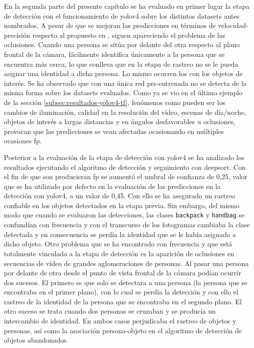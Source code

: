 En la segunda parte del presente capítulo se ha evaluado en primer lugar la etapa de detección con el funcionamiento de \gls{yolov4} sobre los distintos datasets antes nombrados. A pesar de que se mejoran las predicciones en términos de velocidad-precisión respecto al propuesto en \cite{valdivieso2018}, siguen apareciendo el problema de las oclusiones. Cuando una persona se sitúa por delante del otra respecto al plano frontal de la cámara, fácilmente identifica únicamente a la persona que se encuentra más cerca, lo que conlleva que en la etapa de rastreo no se le pueda asignar una identidad a dicha persona. Lo mismo ocurren los con los objetos de interés. Se ha observado que con una única red pre-entrenada no se detecta de la misma forma sobre los datasets evaluados. Como ya se vio en el último ejemplo de la sección \ref{subsec:resultados-yolov4-tf}, fenómenos como pueden ser los cambios de iluminación, calidad en la resolución del vídeo, escenas de día/noche, objetos de interés a largas distancias y en ángulos desfavorables u oclusiones, provocan que las predicciones se vean afectadas ocasionando en múltiples ocasiones \gls{fp}.

Posterior a la evaluación de la etapa de detección con \gls{yolov4} se ha analizado los resultados ejecutando el algoritmo de detección y seguimiento con \gls{deepsort}. Con el fin de que son producieran \gls{fp} se aumentó el umbral de confianza de 0,25, valor que se ha utilizado por defecto en la evaluación de las predicciones en la detección con \gls{yolov4}, a un valor de 0,45. Con ello se ha asegurado un rastreo confiable en los objetos detectados en la etapa previa. Sin embargo, del mismo modo que cuando se evaluaron las detecciones, las clases \texttt{backpack} y \texttt{handbag} se confundían con frecuencia y con el transcurso de los fotogramas cambiaba la clase detectada y en consecuencia se perdía la identidad que se le había asignado a dicho objeto. Otro problema que se ha encontrado con frecuencia y que está totalmente vinculado a la etapa de detección es la aparición de oclusiones en secuencias de vídeo de grandes aglomeraciones de personas. Al pasar una persona por delante de otra desde el punto de vista frontal de la cámara podían ocurrir dos sucesos. El primero es que solo se detectara a una persona (la persona que se encontraba en el primer plano), con lo cual se perdía la detección y con ello el rastreo de la identidad de la persona que se encontraba en el segundo plano. El otro suceso se trata cuando dos personas se cruzaban y se producía un intercambio de identidad. En ambos casos perjudicaba el rastreo de objetos y personas, así como la asociación persona-objeto en el algoritmo de detección de objetos abandonados.

